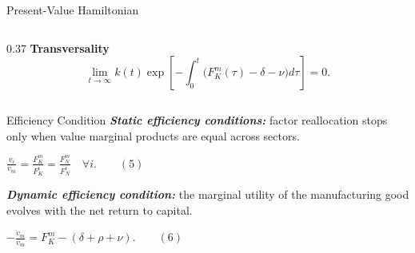 \begin{frame}{Present-Value Hamiltonian}
\begin{columns}[T,onlytextwidth]
\begin{column}{0.37\textwidth}
      \vspace{0.04cm}
      \textbf{Transversality}
      \vspace{-0.10cm}
      \begin{equation*}
        \lim_{t\to\infty}
        k(t)\exp\!\left[-\int_0^t
        \bigl(F_K^m(\tau)-\delta-\nu\bigr)d\tau\right]=0 .
      \end{equation*}
    \end{column}
  \end{columns}
\end{frame}

\begin{frame}[label=efficiencycondition]{Efficiency Condition}
  \scriptsize
  \textbf{\textit{Static efficiency conditions:}} factor reallocation stops only when
  value marginal products are equal across sectors.

  \vspace{0.10cm}
  \begin{center}
    \hyperlink{appendixstatic}{%
      \(\displaystyle
      \frac{v_i}{v_m}
      =
      \frac{F_K^m}{F_K^i}
      =
      \frac{F_N^m}{F_N^i}
      \quad \forall i.
      \qquad (5)
      \)}
  \end{center}

  \vspace{0.14cm}
  \textbf{\textit{Dynamic efficiency condition:}} the marginal utility of the
  manufacturing good evolves with the net return to capital.

  \vspace{0.10cm}
  \begin{center}
    \hyperlink{appendixdynamic}{%
      \(\displaystyle
      -\frac{\dot v_m}{v_m}
      =
      F_K^m-(\delta+\rho+\nu).
      \qquad (6)
      \)}
  \end{center}
\end{frame}

